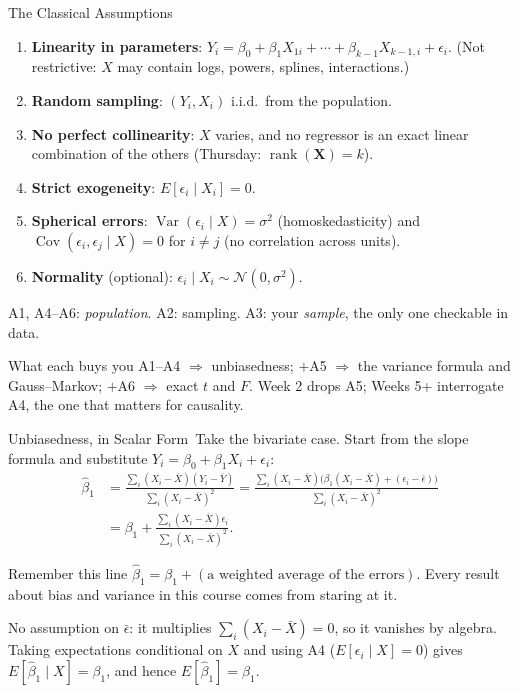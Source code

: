 \documentclass[aspectratio=169,11pt,xcolor=dvipsnames]{beamer}
\DeclareMathOperator{\Cov}{Cov}
\DeclareMathOperator{\Var}{Var}
\DeclareMathOperator{\rank}{rank}
\newcommand{\E}{E}
\newcommand{\X}{\bm{X}}
\newcommand{\core}{\,\raisebox{0.6pt}{\textcolor{corestar}{$\bigstar$}}}
\begin{document}
\begin{frame}{The Classical Assumptions\core}
\begin{enumerate}\itemsep0pt
  \item[\textbf{A1}] \textbf{Linearity in parameters}: $Y_i = \beta_0 + \beta_1X_{1i} + \cdots + \beta_{k-1}X_{k-1,i} + \epsilon_i$.
        (Not restrictive: $X$ may contain logs, powers, splines, interactions.)
  \item[\textbf{A2}] \textbf{Random sampling}: $(Y_i,X_i)$ i.i.d.\ from the population.
  \item[\textbf{A3}] \textbf{No perfect collinearity}: $X$ varies, and no
        regressor is an exact linear combination of the others (Thursday:
        $\rank(\X)=k$).
  \item[\textbf{A4}] \textbf{Strict exogeneity}: $\E[\epsilon_i \mid X_i] = 0$.
  \item[\textbf{A5}] \textbf{Spherical errors}: $\Var(\epsilon_i\mid X)=\sigma^2$
        (homoskedasticity) and $\Cov(\epsilon_i,\epsilon_j\mid X)=0$ for
        $i\neq j$ (no correlation across units).
  \item[\textbf{A6}] \textbf{Normality} (optional):
        $\epsilon_i\mid X_i \sim \mathcal{N}(0,\sigma^2)$.
\end{enumerate}
{\footnotesize A1, A4--A6: \emph{population}. A2: sampling. A3: your
\emph{sample}, the only one checkable in data.}
\begin{block}{What each buys you}
A1--A4 $\Rightarrow$ unbiasedness; $+$A5 $\Rightarrow$ the variance formula
and Gauss--Markov; $+$A6 $\Rightarrow$ exact $t$ and $F$.
\alert{Week 2 drops A5; Weeks 5+ interrogate A4, the one that matters for
causality.}
\end{block}
\end{frame}

\begin{frame}{Unbiasedness, in Scalar Form\core}
Take the bivariate case. Start from the slope formula and substitute
$Y_i = \beta_0+\beta_1X_i+\epsilon_i$:
\begin{align*}
  \hat\beta_1
  &= \frac{\sum_i (X_i-\bar X)(Y_i - \bar Y)}{\sum_i (X_i - \bar X)^2}
   = \frac{\sum_i (X_i-\bar X)\big(\beta_1(X_i - \bar X) + (\epsilon_i - \bar\epsilon)\big)}
          {\sum_i (X_i - \bar X)^2} \\[4pt]
  &= \beta_1 + \frac{\sum_i (X_i - \bar X)\epsilon_i}{\sum_i (X_i-\bar X)^2} .
\end{align*}
\pause
\begin{alertblock}{Remember this line}
$\hat\beta_1 = \beta_1 + (\text{a weighted average of the errors})$. Every result
about bias and variance in this course comes from staring at it.
\end{alertblock}
\vskip-4pt
{\footnotesize No assumption on $\bar\epsilon$: it multiplies
$\sum_i (X_i - \bar X) = 0$, so it vanishes by algebra.}
Taking expectations conditional on $X$ and using A4 ($\E[\epsilon_i\mid X]=0$)
gives $\E[\hat\beta_1\mid X]=\beta_1$, and hence $\E[\hat\beta_1]=\beta_1$.
\end{frame}
\end{document}
